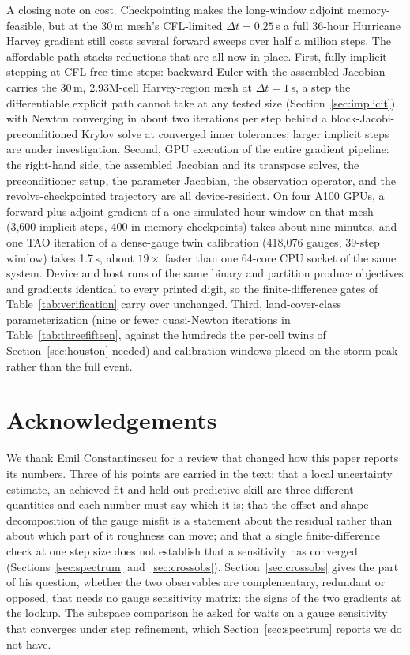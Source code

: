 \documentclass[11pt]{article}
\begin{document}
A closing note on cost. Checkpointing makes the long-window adjoint
memory-feasible, but at the 30\,m mesh's CFL-limited
$\Delta t = 0.25$\,s a full 36-hour Hurricane Harvey gradient still
costs several forward sweeps over half a million steps. The
affordable path stacks reductions that are all now in place. First,
fully implicit stepping at CFL-free time steps: backward Euler with
the assembled Jacobian carries the 30\,m, 2.93M-cell Harvey-region
mesh at $\Delta t = 1$\,s, a step the differentiable explicit path
cannot take at any tested size (Section~\ref{sec:implicit}), with
Newton converging in about two iterations per step behind a
block-Jacobi-preconditioned Krylov solve at converged inner
tolerances; larger implicit steps are under investigation. Second, GPU execution of the entire gradient
pipeline: the right-hand side, the assembled Jacobian and its
transpose solves, the preconditioner setup, the parameter Jacobian,
the observation operator, and the revolve-checkpointed trajectory are
all device-resident. On four A100 GPUs, a forward-plus-adjoint
gradient of a one-simulated-hour window on that mesh (3{,}600
implicit steps, 400 in-memory checkpoints) takes about nine minutes,
and one TAO iteration of a dense-gauge twin calibration
(418{,}076 gauges, 39-step window) takes 1.7\,s, about $19\times$
faster than one 64-core CPU socket of the same system. Device and host
runs of the same binary and partition produce objectives and gradients
identical to every printed digit, so the finite-difference gates of
Table~\ref{tab:verification} carry over unchanged. Third,
land-cover-class parameterization (nine or fewer quasi-Newton
iterations in Table~\ref{tab:threefifteen}, against the hundreds the
per-cell twins of Section~\ref{sec:houston} needed) and calibration
windows placed on the storm peak rather than the full event.

\section*{Acknowledgements}
We thank Emil Constantinescu for a review that changed how this paper
reports its numbers. Three of his points are carried in the text: that
a local uncertainty estimate, an achieved fit and held-out predictive
skill are three different quantities and each number must say which it
is; that the offset and shape decomposition of the gauge misfit is a
statement about the residual rather than about which part of it
roughness can move; and that a single finite-difference check at one
step size does not establish that a sensitivity has converged
(Sections~\ref{sec:spectrum} and~\ref{sec:crossobs}).
Section~\ref{sec:crossobs} gives the part of his question, whether the
two observables are complementary, redundant or opposed, that needs no
gauge sensitivity matrix: the signs of the two gradients at the
lookup. The subspace comparison he asked for waits on a gauge
sensitivity that converges under step refinement, which
Section~\ref{sec:spectrum} reports we do not have.
\end{document}
